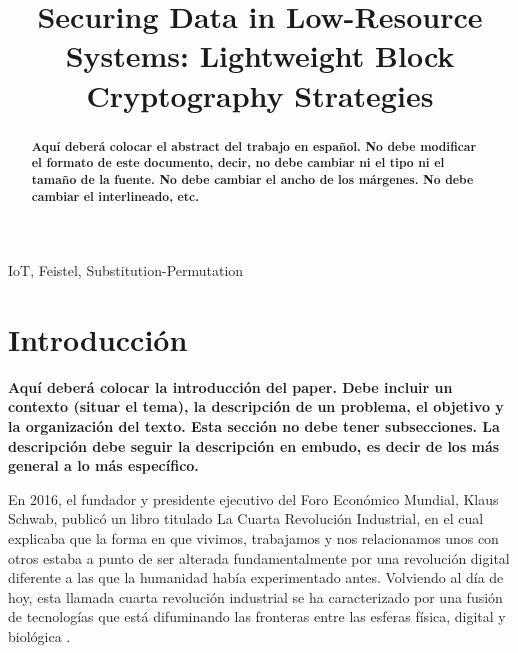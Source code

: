 \documentclass[conference]{IEEEtran}
\begin{document}
\title{Securing Data in Low-Resource Systems: Lightweight Block Cryptography Strategies}


\author{
\and
{}
}


\maketitle

\begin{abstract}

\textbf{Aquí deberá colocar el abstract del trabajo en español.
No debe modificar el formato de este documento, decir, no debe cambiar ni el tipo ni el tamaño de la fuente. No debe cambiar el ancho de los márgenes. No debe cambiar el interlineado, etc.}

\end{abstract}

\begin{IEEEkeywords}
IoT, Feistel, Substitution-Permutation
\end{IEEEkeywords}

\section{Introducción}
\textbf{Aquí deberá colocar la introducción del paper. Debe incluir un contexto (situar el tema), la descripción de un problema, el objetivo y la organización del texto. Esta sección no debe tener subsecciones. La descripción debe seguir la descripción en embudo, es decir de los más general a lo más específico.}

En 2016, el fundador y presidente ejecutivo del Foro Económico Mundial, Klaus Schwab, publicó un libro titulado La Cuarta Revolución Industrial, en el cual explicaba que la forma en que vivimos, trabajamos y nos relacionamos unos con otros estaba a punto de ser alterada fundamentalmente por una revolución digital diferente a las que la humanidad había experimentado antes. Volviendo al día de hoy, esta llamada cuarta revolución industrial se ha caracterizado por una fusión de tecnologías que está difuminando las fronteras entre las esferas física, digital y biológica \cite{WorldEconomicForum}.
\end{document}
